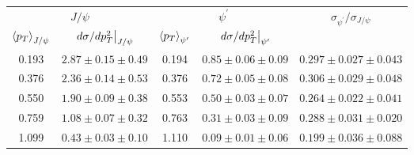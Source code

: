 \begin{tabular}{cc|cc|c}
\hline
\multicolumn{2}{c|}{$J/\psi$}                     & \multicolumn{2}{c|}{$\psi^{\prime}$}              & \multirow{2}{*}{$\sigma_{\psi^\prime}/\sigma_{J/\psi}$} \\ \cline{1-4}
$\expval{p_T}_{J/\psi}$ & $\eval{d\sigma/dp^2_T}_{J/\psi}$ & $\expval{p_T}_{\psi^\prime}$ & $\eval{d\sigma/dp^2_T}_{\psi^\prime}$ &  \\ \hline
\multicolumn{1}{c|}{0.193} & $2.87\pm0.15\pm0.49$ & \multicolumn{1}{c|}{0.194} & \multicolumn{1}{c|}{$0.85\pm0.06\pm0.09$} & $0.297\pm0.027\pm0.043$                \\
\multicolumn{1}{c|}{0.376} & $2.36\pm0.14\pm0.53$ & \multicolumn{1}{c|}{0.376} & \multicolumn{1}{c|}{$0.72\pm0.05\pm0.08$} & $0.306\pm0.029\pm0.048$                \\
\multicolumn{1}{c|}{0.550} & $1.90\pm0.09\pm0.38$ & \multicolumn{1}{c|}{0.553} & \multicolumn{1}{c|}{$0.50\pm0.03\pm0.07$} & $0.264\pm0.022\pm0.041$                \\
\multicolumn{1}{c|}{0.759} & $1.08\pm0.07\pm0.32$ & \multicolumn{1}{c|}{0.763} & \multicolumn{1}{c|}{$0.31\pm0.03\pm0.09$} & $0.288\pm0.031\pm0.020$                \\
\multicolumn{1}{c|}{1.099} & $0.43\pm0.03\pm0.10$ & \multicolumn{1}{c|}{1.110} & \multicolumn{1}{c|}{$0.09\pm0.01\pm0.06$} & $0.199\pm0.036\pm0.088$                \\ \hline
\end{tabular}
